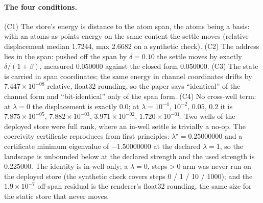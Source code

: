 \documentclass{article}
\newcommand{\sci}[2]{\ensuremath{#1\times10^{#2}}}
\begin{document}
\paragraph{The four conditions.} (C1) The store's energy is distance to the atom span, the atoms
being a basis: with an atoms-as-points energy on the same content the settle moves (relative
displacement median 1.7244, max 2.6682 on a synthetic check). (C2) The address lies in the span:
pushed off the span by $\delta=0.10$ the settle moves by exactly $\delta/(1+\beta)$, measured
0.050000 against the closed form 0.050000. (C3) The state is carried in span coordinates; the same
energy in channel coordinates drifts by \sci{7.447}{-08} relative, float32 rounding, so the paper
says ``identical'' of the channel form and ``bit-identical'' only of the span form. (C4) No
cross-well term: at $\lambda=0$ the displacement is exactly 0.0; at
$\lambda=10^{-4}$, $10^{-2}$, $0.05$, $0.2$ it is \sci{7.875}{-05}, \sci{7.882}{-03},
\sci{3.971}{-02}, \sci{1.720}{-01}. Two wells of the deployed store were full rank, where an in-well
settle is trivially a no-op. The coercivity certificate reproduces from first principles:
$\lambda^\star=0.25000000$ and a certificate minimum eigenvalue of $-1.50000000$ at the declared
$\lambda=1$, so the landscape is unbounded below at the declared strength and the used strength is
0.225000.
The identity is in-well only; a $\lambda=0$, steps$>0$ arm was never run on the deployed store (the
synthetic check covers steps 0 / 1 / 10 / 1000); and the \sci{1.9}{-7} off-span residual is the
renderer's float32 rounding, the same size for the static store that never moves.
\end{document}
